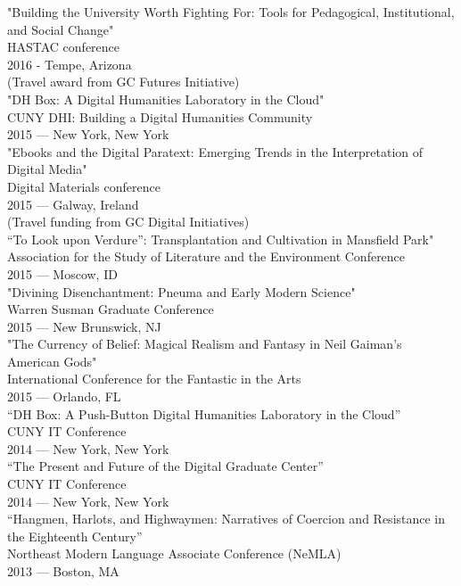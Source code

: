\documentclass[11pt]{article}
\begin{document}
"Building the University Worth Fighting For: Tools for Pedagogical, Institutional, and Social Change"\\
HASTAC conference\\
2016 - Tempe, Arizona\\
(Travel award from GC Futures Initiative)\\

"DH Box: A Digital Humanities Laboratory in the Cloud"\\
CUNY DHI: Building a Digital Humanities Community\\
2015 — New York, New York\\

"Ebooks and the Digital Paratext: Emerging Trends in the Interpretation of Digital Media"\\
Digital Materials conference\\
2015 — Galway, Ireland\\
(Travel funding from GC Digital Initiatives)\\

“To Look upon Verdure”: Transplantation and Cultivation in Mansfield Park"\\
Association for the Study of Literature and the Environment Conference\\
2015 — Moscow, ID\\

"Divining Disenchantment: Pneuma and Early Modern Science"\\
Warren Susman Graduate Conference\\
2015 — New Brunswick, NJ\\

"The Currency of Belief: Magical Realism and Fantasy in Neil Gaiman’s American Gods"\\
International Conference for the Fantastic in the Arts\\
2015 — Orlando, FL\\

“DH Box: A Push-Button Digital Humanities Laboratory in the Cloud”\\
CUNY IT Conference\\
2014 — New York, New York\\

“The Present and Future of the Digital Graduate Center”\\
CUNY IT Conference\\
2014 — New York, New York\\

“Hangmen, Harlots, and Highwaymen: Narratives of Coercion and Resistance in the Eighteenth Century”\\
Northeast Modern Language Associate Conference (NeMLA)\\
2013 — Boston, MA\\
\end{document}
